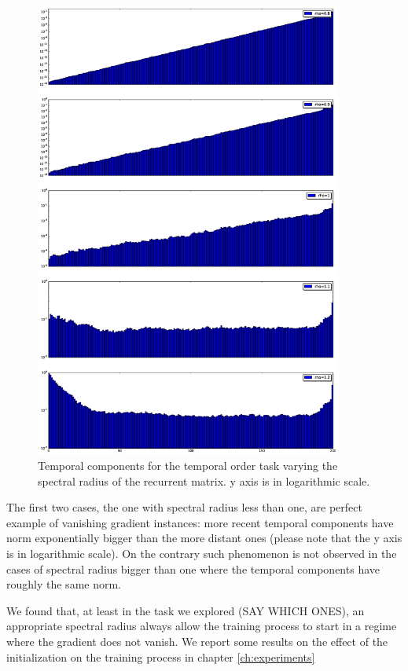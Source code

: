 \begin{figure}
    \includegraphics[width=0.9\textwidth]{chapter3/temporal_components.eps}
    \caption{Temporal components for the temporal order task varying the spectral radius of the recurrent matrix. y axis is in logarithmic scale.}
    \label{fig:temporal_norms}
\end{figure}

The first two cases, the one with spectral radius less than one, are perfect example of vanishing gradient instances: more recent temporal components have norm exponentially bigger than the more distant ones (please note that the y axis is in logarithmic scale). On the contrary such phenomenon is not observed in the cases of spectral radius bigger than one where the temporal components have roughly the same norm.

We found that, at least in the task we explored (SAY WHICH ONES), an appropriate spectral radius always allow the training process to start in a regime where the gradient does not vanish. We report some results on the effect of the initialization on the training process in chapter \ref{ch:experiments}

